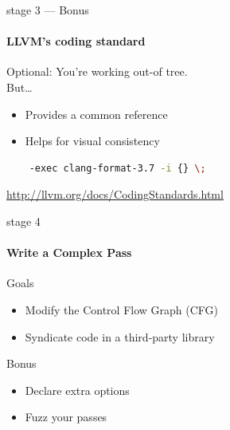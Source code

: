 \documentclass[14pt]{beamer}
\begin{document}
    \begin{frame}[containsverbatim]{stage 3 --- Bonus}
        \framesubtitle{LLVM's coding standard}

        \alert{Optional}: You're working out-of tree.\\
        But\dots
        \begin{itemize}
            \item Provides a common reference
            \item Helps for visual consistency
        \end{itemize}
        {
            \footnotesize
\begin{lstlisting}[language=bash]
% find . \( -name '*.cpp' -o -name '*.h' \) \
    -exec clang-format-3.7 -i {} \;
\end{lstlisting}
        }
        \url{http://llvm.org/docs/CodingStandards.html}

    \end{frame}



    \begin{frame}{stage 4}

        \framesubtitle{Write a Complex Pass}

        \begin{block}{Goals}
            \begin{itemize}
                \item Modify the Control Flow Graph (CFG)
                \item Syndicate code in a third-party library
            \end{itemize}

        \end{block}

        \begin{alertblock}{Bonus}
            \begin{itemize}
                \item Declare extra options
                \item Fuzz your passes
            \end{itemize}
        \end{alertblock}

    \end{frame}
\end{document}
